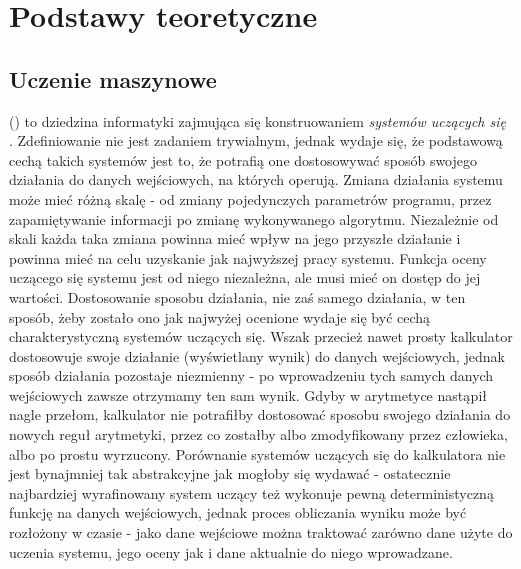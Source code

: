 \chapter{Podstawy teoretyczne}

\section{Uczenie maszynowe}
 () to dziedzina informatyki zajmująca się konstruowaniem \textit{systemów uczących się} \cite{krawiec2003uczenie}. Zdefiniowanie  nie jest zadaniem trywialnym, jednak wydaje się, że podstawową cechą takich systemów jest to, że potrafią one dostosowywać sposób swojego działania do danych wejściowych, na których operują. Zmiana działania systemu może mieć różną skalę - od zmiany pojedynczych parametrów programu, przez zapamiętywanie informacji po zmianę wykonywanego algorytmu. Niezależnie od skali każda taka zmiana powinna mieć wpływ na jego przyszłe działanie i powinna mieć na celu uzyskanie jak najwyższej  pracy systemu. Funkcja oceny uczącego się systemu jest od niego niezależna, ale musi mieć on dostęp do jej wartości. Dostosowanie sposobu działania, nie zaś samego działania, w ten sposób, żeby zostało ono jak najwyżej ocenione wydaje się być cechą charakterystyczną systemów uczących się. 
Wszak przecież nawet prosty kalkulator dostosowuje swoje działanie (wyświetlany wynik) do danych wejściowych, jednak sposób działania pozostaje niezmienny - po wprowadzeniu tych samych danych wejściowych zawsze otrzymamy ten sam wynik. Gdyby w arytmetyce nastąpił nagle przełom, kalkulator nie potrafiłby dostosować sposobu swojego działania do nowych reguł arytmetyki, przez co zostałby albo zmodyfikowany przez człowieka, albo po prostu wyrzucony. Porównanie systemów uczących się do kalkulatora nie jest bynajmniej tak abstrakcyjne jak mogłoby się wydawać - ostatecznie najbardziej wyrafinowany system uczący też wykonuje pewną deterministyczną funkcję na danych wejściowych, jednak proces obliczania wyniku może być rozłożony w czasie - jako dane wejściowe można traktować zarówno dane użyte do uczenia systemu, jego oceny jak i dane aktualnie do niego wprowadzane.

